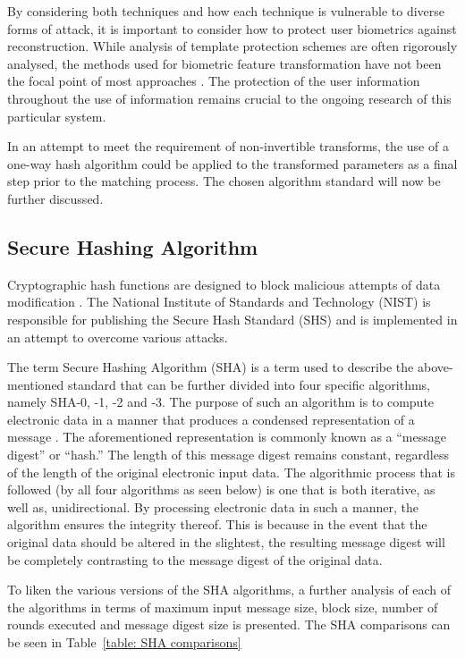    
    By considering both techniques and how each technique is vulnerable to diverse forms of attack, it is important to consider how to protect user biometrics against reconstruction. While analysis of template protection schemes are often rigorously analysed, the methods used for biometric feature transformation have not been the focal point of most approaches \citep{Nagar2009}. The protection of the user information throughout the use of information remains crucial to the ongoing research of this particular system. 
    
    In an attempt to meet the requirement of non-invertible transforms, the use of a one-way hash algorithm could be applied to the transformed parameters as a final step prior to the matching process. The chosen algorithm standard will now be further discussed.

    \subsection{ Secure Hashing Algorithm}
    
    Cryptographic hash functions are designed to block malicious attempts of data modification \citep{Pfleeger2015}. The National Institute of Standards and Technology (NIST) is responsible for publishing the Secure Hash Standard (SHS) and is implemented in an attempt to overcome various attacks. 
    
    The term Secure Hashing Algorithm (SHA) is a term used to describe the above-mentioned standard that can be further divided into four specific algorithms, namely SHA-0, -1, -2 and -3. The purpose of such an algorithm is to compute electronic data in a manner that produces a condensed representation of a message \citep{Foti2015}. The aforementioned representation is commonly known as a “message digest” or “hash.” The length of this message digest remains constant, regardless of the length of the original electronic input data. The algorithmic process that is followed (by all four algorithms as seen below) is one that is both iterative, as well as, unidirectional. By processing electronic data in such a manner, the algorithm ensures the integrity thereof. This is because in the event that the original data should be altered in the slightest, the resulting message digest will be completely contrasting to the message digest of the original data. 
    
    To liken the various versions of the SHA algorithms, a further analysis of each of the algorithms in terms of maximum input message size, block size, number of rounds executed and message digest size is presented. The SHA comparisons can be seen in Table~\ref{table: SHA comparisons}
    
